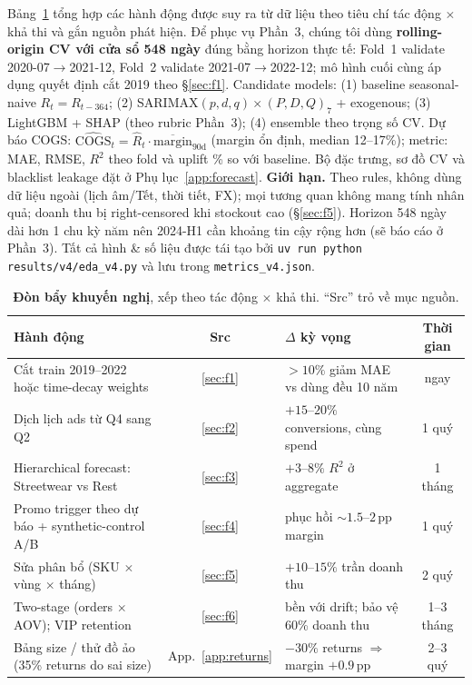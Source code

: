 \documentclass{article}
\newcommand{\keyfact}[1]{\textcolor{accent}{\textbf{#1}}}
\begin{document}
Bảng~\ref{tab:recs} tổng hợp các hành động được suy ra từ dữ liệu theo tiêu chí tác động $\times$ khả thi và gắn nguồn phát hiện. Để phục vụ Phần~3, chúng tôi dùng \keyfact{rolling-origin CV với cửa sổ 548 ngày} đúng bằng horizon thực tế: Fold~1 validate 2020-07$\to$2021-12, Fold~2 validate 2021-07$\to$2022-12; mô hình cuối cùng áp dụng quyết định cắt 2019 theo \S\ref{sec:f1}. Candidate models: (1) baseline seasonal-naive $R_t{=}R_{t-364}$; (2) SARIMAX$(p,d,q){\times}(P,D,Q)_7$ + exogenous; (3) LightGBM + SHAP (theo rubric Phần~3); (4) ensemble theo trọng số CV. Dự báo COGS: $\widehat{\text{COGS}}_t{=}\hat R_t \cdot \overline{\text{margin}}_{90\text{d}}$ (margin ổn định, median 12--17\%); metric: MAE, RMSE, $R^2$ theo fold và uplift \% so với baseline. Bộ đặc trưng, sơ đồ CV và blacklist leakage đặt ở Phụ lục~\ref{app:forecast}. \textbf{Giới hạn.} Theo rules, không dùng dữ liệu ngoài (lịch âm/Tết, thời tiết, FX); mọi tương quan không mang tính nhân quả; doanh thu bị right-censored khi stockout cao (\S\ref{sec:f5}). Horizon 548 ngày dài hơn 1 chu kỳ năm nên 2024-H1 cần khoảng tin cậy rộng hơn (sẽ báo cáo ở Phần~3). Tất cả hình \& số liệu được tái tạo bởi \texttt{uv run python results/v4/eda\_v4.py} và lưu trong \texttt{metrics\_v4.json}.

\begin{table}[t]
  \caption{\textbf{Đòn bẩy khuyến nghị}, xếp theo tác động $\times$ khả thi. ``Src'' trỏ về mục nguồn.}
  \label{tab:recs}
  \centering
  \small
  \begin{tabular}{@{}p{4.7cm} c p{4.5cm} c@{}}
    \toprule
    \textbf{Hành động} & \textbf{Src} & \textbf{$\Delta$ kỳ vọng} & \textbf{Thời gian} \\
    \midrule
    Cắt train 2019--2022 hoặc time-decay weights       & \ref{sec:f1} & $>\!10\%$ giảm MAE vs dùng đều 10 năm & ngay \\
    Dịch lịch ads từ Q4 sang Q2                         & \ref{sec:f2} & $+15$--$20\%$ conversions, cùng spend & 1 quý \\
    Hierarchical forecast: Streetwear vs Rest           & \ref{sec:f3} & $+3$--$8\%$ $R^2$ ở aggregate & 1 tháng \\
    Promo trigger theo dự báo + synthetic-control A/B   & \ref{sec:f4} & phục hồi $\sim\!1.5$--$2$\,pp margin & 1 quý \\
    Sửa phân bổ (SKU $\times$ vùng $\times$ tháng)      & \ref{sec:f5} & $+10$--$15\%$ trần doanh thu & 2 quý \\
    Two-stage (orders $\times$ AOV); VIP retention      & \ref{sec:f6} & bền với drift; bảo vệ 60\% doanh thu & 1--3 tháng \\
    Bảng size / thử đồ ảo (35\% returns do sai size)    & App.~\ref{app:returns} & $-30\%$ returns $\Rightarrow$ margin $+0.9$\,pp & 2--3 quý \\
    \bottomrule
  \end{tabular}
\end{table}
\end{document}
